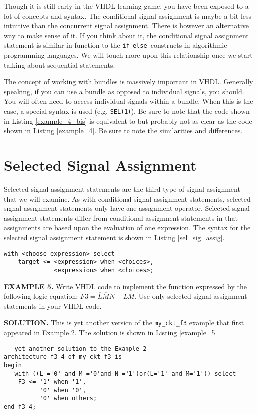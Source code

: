 Though it is still early in the VHDL learning game, you have been exposed to a lot of concepts and syntax. The conditional signal assignment is maybe a bit less intuitive than the concurrent signal assignment. There is however an alternative way to make sense of it. If you think about it, the conditional signal assignment statement is similar in function to the \texttt{if-else }constructs in algorithmic programming languages. We will touch more upon this relationship once we start talking about sequential statements.

The concept of working with bundles is massively important in VHDL. Generally speaking, if you can use a bundle as opposed to individual signals, you should. You will often need to access individual signals within a bundle. When this is the case, a special syntax is used (e.g. \texttt{SEL(1)}). Be sure to note that the code shown in Listing \ref{example_4_bis} is equivalent to but probably not as clear as the code shown in Listing \ref{example_4}. Be sure to note the similarities and differences.

\section{Selected Signal Assignment}
Selected signal assignment statements are the third type of signal assignment that we will examine. As with conditional signal assignment statements, selected signal assignment statements only have one assignment operator. Selected signal assignment statements differ from conditional assignment statements in that assignments are based upon the evaluation of one expression. The syntax for the selected signal assignment statement is shown in Listing \ref{sel_sig_assig}.
\begin{lstlisting}[label=sel_sig_assig, caption=Syntax for the selected signal assignment statement.]
with <choose_expression> select
	target <= <expression> when <choices>,
	          <expression> when <choices>;
\end{lstlisting}

\newpage\clearpage
\begin{leftbar}
\noindent
\textbf{EXAMPLE 5.}
Write VHDL code to implement the function expressed by the following logic equation: $F3=\overline{L}\overline{M}N+LM$. Use only selected signal assignment statements in your VHDL code.
\end{leftbar}
\noindent
\textbf{SOLUTION.} This is yet another version of the \texttt{my\_ckt\_f3} example that first appeared in Example 2. The solution is shown in Listing \ref{example_5}.
\begin{lstlisting}[label=example_5, caption=Solution of Example 5.]
-- yet another solution to the Example 2
architecture f3_4 of my_ckt_f3 is
begin
   with ((L ='0' and M ='0'and N ='1')or(L='1' and M='1')) select
	F3 <= '1' when '1',
	      '0' when '0',
	      '0' when others;
end f3_4;
\end{lstlisting}

